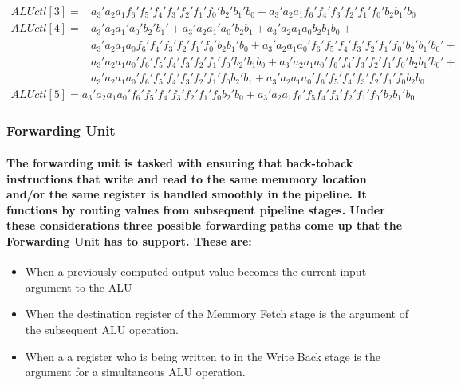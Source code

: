 \documentclass[12pt,a4paper]{report}
\begin{document}
\begin{equation}
\begin{aligned}
ALUctl[3] = & a_3'a_2a_1f_6'f_5'f_4'f_3'f_2'f_1'f_0'b_2'b_1'b_0 + a_3'a_2a_1f_6'f_4'f_3'f_2'f_1'f_0'b_2b_1'b_0
\end{aligned}
\label{eq:aluctl3}
\end{equation}
\begin{equation}
\begin{aligned}
ALUctl[4] = & a_3'a_2a_1'a_0'b_2'b_1' + a_3'a_2a_1'a_0'b_2b_1 + 
a_3'a_2a_1a_0b_2b_1b_0 +\\
& a_3'a_2a_1a_0f_6'f_4'f_3'f_2'f_1'f_0'b_2b_1'b_0 + 
a_3'a_2a_1a_0'f_6'f_5'f_4'f_3'f_2'f_1'f_0'b_2'b_1'b_0' +\\
&  a_3'a_2a_1a_0'f_6'f_5'f_4'f_3'f_2'f_1'f_0'b_2'b_1b_0 + 
a_3'a_2a_1a_0'f_6'f_4'f_3'f_2'f_1'f_0'b_2b_1'b_0' +\\
&  a_3'a_2a_1a_0'f_6'f_5'f_4'f_3'f_2'f_1'f_0b_2'b_1 +  a_3'a_2a_1a_0'f_6'f_5'f_4'f_3'f_2'f_1'f_0b_2b_0
\end{aligned}
\label{eq:aluctl4}
\end{equation}
\begin{equation}
\begin{aligned}
ALUctl[5] =  a_3'a_2a_1a_0'f_6'f_5'f_4'f_3'f_2'f_1'f_0b_2'b_0 +  a_3'a_2a_1f_6'f_5f_4'f_3'f_2'f_1'f_0'b_2b_1'b_0
\end{aligned}
\label{eq:aluctl5}
\end{equation}
\subsubsection{Forwarding Unit}
\paragraph{\textrm{\textmd{The forwarding unit is tasked with ensuring that back-toback instructions that write and read to the same memmory location and/or the same register is handled smoothly in the pipeline. It functions by routing values from subsequent pipeline stages. Under these considerations three possible forwarding paths come up that the Forwarding Unit has to support. These are:}}}
\begin{itemize}
	\item When a previously computed output value becomes the current input argument to the ALU
	\item When the destination register of the Memmory Fetch stage is the argument of the subsequent ALU operation.
	\item When a a register who is being written to in the Write Back stage is the argument for a simultaneous ALU operation.
\end{itemize}
\end{document}
